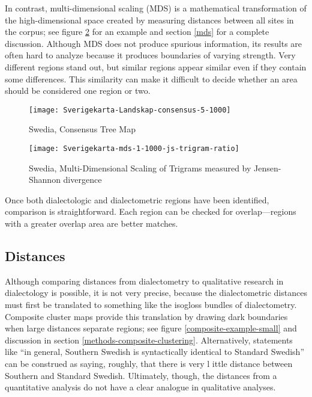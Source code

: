 In contrast, multi-dimensional scaling (MDS) is a mathematical
transformation of the high-dimensional space created by measuring
distances between all sites in the corpus; see figure
\ref{mds-example-small} for an example and section \ref{mds} for a
complete discussion. Although MDS does not produce
spurious information, its results are often hard to analyze because it
produces boundaries of varying strength. Very different regions stand
out, but similar regions appear similar even if they contain some
differences. This similarity can make it difficult to decide whether
an area should be considered one region or two.

\begin{figure}
  \texttt{[image: Sverigekarta-Landskap-consensus-5-1000]}
 \caption{Swedia, Consensus Tree Map}
  \label{consensus-example-small}
\end{figure}

\begin{figure}
  \texttt{[image: Sverigekarta-mds-1-1000-js-trigram-ratio]}
 \caption{Swedia, Multi-Dimensional Scaling of Trigrams measured by
    Jensen-Shannon divergence}
  \label{mds-example-small}
\end{figure}

Once both dialectologic and dialectometric regions have been
identified, comparison is straightforward. Each region can be checked
for overlap---regions with a greater overlap area are better matches.

\subsection{Distances}

Although comparing distances from dialectometry to qualitative
research in dialectology is possible, it is not very precise, because
the dialectometric distances must first be translated to something
like the isogloss bundles of dialectometry. Composite cluster maps
provide this translation by drawing dark boundaries when large
distances separate regions; see figure
\ref{composite-example-small} and discussion in section
\ref{methods-composite-clustering}. Alternatively, statements like ``in
general, Southern Swedish is syntactically identical to Standard
Swedish'' \cite{rosenkvist07} can be construed as saying, roughly,
that there is very l ittle distance between Southern and Standard
Swedish. Ultimately, though, the distances from a quantitative
analysis do not have a clear analogue in qualitative analyses.

